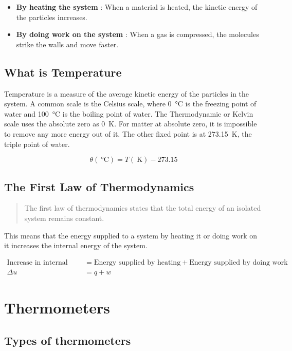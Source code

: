 \documentclass{scrbook}
\begin{document}
	\begin{itemize}
		\item
			\textbf{By heating the system} : When a material is heated, the kinetic energy of the particles increases.
		\item
			\textbf{By doing work on the system} : When a gas is compressed, the molecules strike the walls and move faster.
	\end{itemize}

\subsection{What is Temperature}

	Temperature is a measure of the average kinetic energy of the particles in the system. A common scale is the Celsius scale, where \SI{0}{\celsius} is the freezing point of water and \SI{100}{\celsius} is the boiling point of water. The Thermodynamic or Kelvin scale uses the absolute zero as \SI{0}{\kelvin}. For matter at absolute zero, it is impossible to remove any more energy out of it. The other fixed point is at \SI{273.15}{\kelvin}, the triple point of water.

	\[ \theta (\SI{}{\celsius}) = T (\SI{}{\kelvin}) -273.15 \]

\subsection{The First Law of Thermodynamics}

	\begin{quote}
		The first law of thermodynamics states that the total energy of an isolated system remains constant.
	\end{quote}

	This means that the energy supplied to a system by heating it or doing work on it increases the internal energy of the system.

	\begin{align*}
		\text{Increase in internal energy} &= \text{Energy supplied by heating} +  \text{Energy supplied by doing work} \\
		\Delta u &= q + w
	\end{align*}

\section{Thermometers}

\subsection{Types of thermometers}
\end{document}
